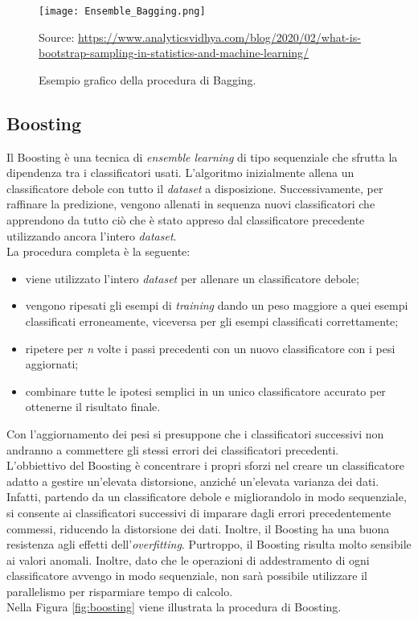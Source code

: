 \begin{figure}[h]
	\begin{center}
		\texttt{[image: Ensemble\_Bagging.png]}
		\caption{Esempio grafico della procedura di Bagging.
		} 
		Source: \url{https://www.analyticsvidhya.com/blog/2020/02/what-is-bootstrap-sampling-in-statistics-and-machine-learning/}\label{fig:bagging}
	\end{center}
\end{figure}

\subsection{Boosting}
Il Boosting \autocite{freund1996experiments} è una tecnica di \emph{ensemble learning} di tipo sequenziale che sfrutta la dipendenza tra i classificatori usati. L'algoritmo inizialmente allena un classificatore debole con tutto il \emph{dataset} a disposizione. Successivamente, per raffinare la predizione, vengono allenati in sequenza nuovi classificatori che apprendono da tutto ciò che è stato appreso dal classificatore precedente utilizzando ancora l'intero \emph{dataset}.\\
La procedura completa è la seguente:
\begin{itemize}
	\item viene utilizzato l'intero \emph{dataset} per allenare un classificatore debole;
	\item vengono ripesati gli esempi di \emph{training} dando un peso maggiore a quei esempi classificati erroneamente, viceversa per gli esempi classificati correttamente;
	\item ripetere per \emph{n} volte i passi precedenti con un nuovo classificatore con i pesi aggiornati;
	\item combinare tutte le ipotesi semplici in un unico classificatore accurato per ottenerne il risultato finale.
\end{itemize}
Con l'aggiornamento dei pesi si presuppone che i classificatori successivi non andranno a commettere gli stessi errori dei classificatori precedenti.\\
L'obbiettivo del Boosting è concentrare i propri sforzi nel creare un classificatore adatto a gestire un'elevata distorsione, anziché un'elevata varianza dei dati. Infatti, partendo da un classificatore debole e migliorandolo in modo sequenziale, si consente ai classificatori successivi di imparare dagli errori precedentemente commessi, riducendo la distorsione dei dati. Inoltre, il Boosting ha una buona resistenza agli effetti dell'\emph{overfitting}.
Purtroppo, il Boosting risulta molto sensibile ai valori anomali. Inoltre, dato che le operazioni di addestramento di ogni classificatore avvengo in modo sequenziale, non sarà possibile utilizzare il parallelismo per risparmiare tempo di calcolo.\\
Nella Figura \ref{fig:boosting} viene illustrata la procedura di Boosting.

